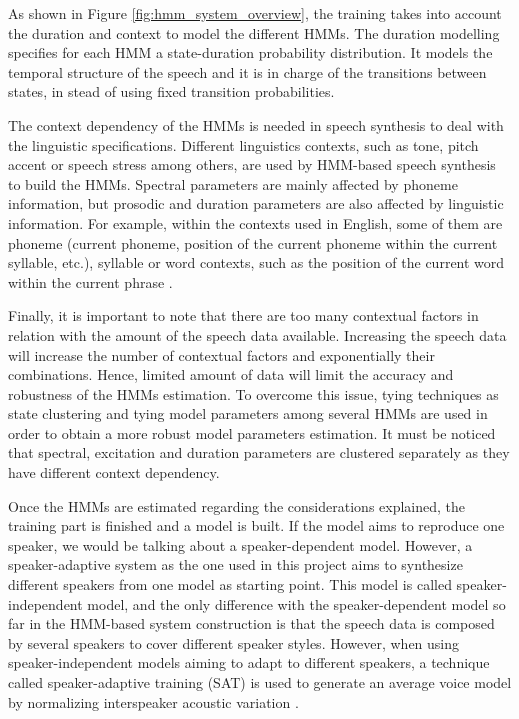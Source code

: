 As shown in Figure \ref{fig:hmm_system_overview}, the training takes into account the duration and context to model the different HMMs.
%
The duration modelling specifies for each HMM a state-duration probability distribution.
%
It models the temporal structure of the speech and it is in charge of the transitions between states, in stead of using fixed transition probabilities.

The context dependency of the HMMs is needed in speech synthesis to deal with the linguistic specifications.
%
Different linguistics contexts, such as tone, pitch accent or speech stress among others, are used by HMM-based speech synthesis to build the HMMs.
%
Spectral parameters are mainly affected by phoneme information, but prosodic and duration parameters are also affected by linguistic information. For example, within the contexts used in English, some of them are phoneme (current phoneme, position of the current phoneme within the current syllable, etc.), syllable or word contexts, such as the position of the current word within the current phrase \cite{tokuda13}.

Finally, it is important to note that there are too many contextual factors in relation with the amount of the speech data available. 
%
Increasing the speech data will increase the number of contextual factors and exponentially their combinations.
%
Hence, limited amount of data will limit the accuracy and robustness of the HMMs estimation.
%
To overcome this issue, tying techniques as state clustering and tying model parameters among several HMMs are used in order to obtain a more robust model parameters estimation.
%
It must be noticed that spectral, excitation and duration parameters are clustered separately as they have different context dependency.

Once the HMMs are estimated regarding the considerations explained, the training part is finished and a model is built.
%
If the model aims to reproduce one speaker, we would be talking about a speaker-dependent model.
%
However, a speaker-adaptive system as the one used in this project aims to synthesize different speakers from one model as starting point.
%
This model is called speaker-independent model, and the only difference with the speaker-dependent model so far in the HMM-based system construction is that the speech data is composed by several speakers to cover different speaker styles.
%
However, when using speaker-independent models aiming to adapt to different speakers, a technique called speaker-adaptive training (SAT) is used to generate an average voice model by normalizing interspeaker acoustic variation \cite{anastasakos1996, yamagishi2003training}.

